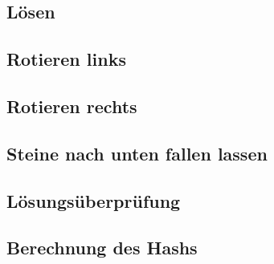 \subsection{Lösen}
		
\clearpage
\subsection{Rotieren links}
		
\subsection{Rotieren rechts}
		
\subsection{Steine nach unten fallen lassen}
		
\clearpage
\subsection{Lösungsüberprüfung}
		
\clearpage
\subsection{Berechnung des Hashs}
		

